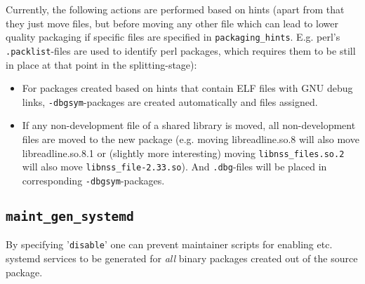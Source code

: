 \documentclass[a4paper]{scrartcl}
\newcommand{\file}[1]{\texttt{#1}}
\begin{document}
	Currently, the following actions are performed based on hints (apart from that they just move files, but before moving any other file which can lead to lower quality packaging if specific files are specified in \texttt{packaging\_hints}. E.g. perl's \file{.packlist}-files are used to identify perl packages, which requires them to be still in place at that point in the splitting-stage):
	
	\begin{itemize}
		\item For packages created based on hints that contain ELF files with GNU debug links, \texttt{-dbgsym}-packages are created automatically and files assigned.
		
		\item If any non-development file of a shared library is moved, all non-development files are moved to the new package (e.g. moving libreadline.so.8 will also move libreadline.so.8.1 or (slightly more interesting) moving \file{libnss\_files.so.2} will also move \file{libnss\_file-2.33.so}). And \file{.dbg}-files will be placed in corresponding \texttt{-dbgsym}-packages.
	\end{itemize}

	\subsection{\texttt{maint\_gen\_systemd}}
	\label{sec:maint_gen_systemd}
	
	By specifying '\texttt{disable}' one can prevent maintainer scripts for enabling etc. systemd services to be generated for \textit{all} binary packages created out of the source package.
	
\end{document}
